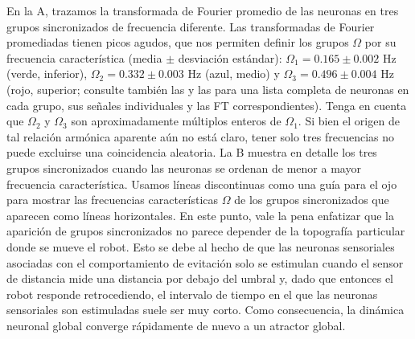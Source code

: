 En la A, trazamos la transformada de Fourier promedio de las neuronas en tres grupos sincronizados de frecuencia diferente. Las transformadas de Fourier promediadas tienen picos agudos, que nos permiten definir los grupos $\Omega$ por su frecuencia característica (media $\pm$ desviación estándar): $\Omega_1 = 0.165 \pm 0.002$ Hz (verde, inferior), $\Omega_2 = 0.332 \pm 0.003$ Hz (azul, medio) y $\Omega_3 = 0.496 \pm 0.004$ Hz (rojo, superior; consulte también las   y las  para una lista completa de neuronas en cada grupo, sus señales individuales y las FT correspondientes). Tenga en cuenta que $\Omega_2$ y $\Omega_3$ son aproximadamente múltiplos enteros de $\Omega_1$. Si bien el origen de tal relación armónica aparente aún no está claro, tener solo tres frecuencias no puede excluirse una coincidencia aleatoria. La B muestra en detalle los tres grupos sincronizados cuando las neuronas se ordenan de menor a mayor frecuencia característica. Usamos líneas discontinuas como una guía para el ojo para mostrar las frecuencias características $\Omega$ de los grupos sincronizados que aparecen como líneas horizontales. En este punto, vale la pena enfatizar que la aparición de grupos sincronizados no parece depender de la topografía particular donde se mueve el robot. Esto se debe al hecho de que las neuronas sensoriales asociadas con el comportamiento de evitación solo se estimulan cuando el sensor de distancia mide una distancia por debajo del umbral y, dado que entonces el robot responde retrocediendo, el intervalo de tiempo en el que las neuronas sensoriales son estimuladas suele ser muy corto. Como consecuencia, la dinámica neuronal global converge rápidamente de nuevo a un atractor global.



